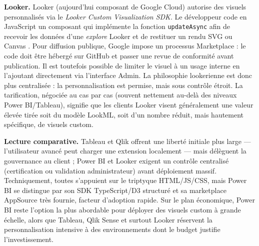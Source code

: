 \textbf{Looker.}
Looker (aujourd’hui composant de Google Cloud) autorise des visuels
personnalisés via le \emph{Looker Custom Visualization SDK}. Le
développeur code en JavaScript un composant qui implémente la fonction
\texttt{updateAsync} afin de recevoir les données d’une
\emph{explore} Looker et de restituer un rendu SVG ou Canvas
\parencite{LookerVizSDK2025}. Pour diffusion publique, Google impose un
processus Marketplace : le code doit être hébergé sur GitHub et passer une
revue de conformité avant publication\parencite{LookerMarketplace2024}. Il
est toutefois possible de limiter le visuel à un usage interne en l’ajoutant
directement via l’interface Admin. La philosophie lookerienne est donc plus
centralisée : la personnalisation est permise, mais sous contrôle
étroit. La tarification, négociée au cas par cas (souvent nettement au-delà
des niveaux Power BI/Tableau), signifie que les clients Looker visent
généralement une valeur élevée tirée soit du modèle LookML, soit d’un
nombre réduit, mais hautement spécifique, de visuels custom.

\textbf{Lecture comparative.}
Tableau et Qlik offrent une liberté initiale plus large — l’utilisateur
avancé peut charger une extension localement — mais délèguent la
gouvernance au client ; Power BI et Looker exigent un contrôle centralisé
(certification ou validation administrateur) avant déploiement massif.
Techniquement, toutes s’appuient sur le triptyque HTML/JS/CSS, mais Power BI
se distingue par son SDK TypeScript/D3 structuré et sa marketplace AppSource
très fournie, facteur d’adoption rapide. Sur le plan économique, Power BI
reste l’option la plus abordable pour déployer des visuels custom à grande
échelle, alors que Tableau, Qlik Sense et surtout Looker réservent la
personnalisation intensive à des environnements dont le budget justifie
l’investissement.
